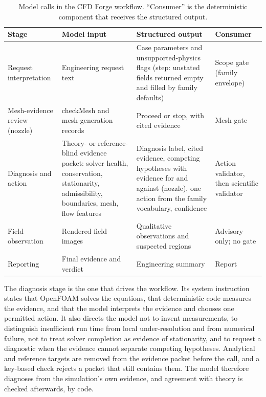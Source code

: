 \documentclass[11pt]{article}
\begin{document}
\begin{table}[!htbp]
\centering
\caption{Model calls in the CFD Forge workflow. ``Consumer'' is the
deterministic component that receives the structured output.}
\label{tab:llm_stages}
\footnotesize
\setlength{\tabcolsep}{3pt}
\begin{tabularx}{\linewidth}{@{}>{\raggedright\arraybackslash}p{2.3cm}
  >{\raggedright\arraybackslash}X >{\raggedright\arraybackslash}X
  >{\raggedright\arraybackslash}p{3.1cm}@{}}
\toprule
Stage & Model input & Structured output & Consumer \\
\midrule
Request interpretation & Engineering request text & Case parameters and unsupported-physics flags (step: unstated fields returned empty and filled by family defaults) & Scope gate (family envelope) \\
Mesh-evidence review (nozzle) & checkMesh and mesh-generation records & Proceed or stop, with cited evidence & Mesh gate \\
Diagnosis and action & Theory- or reference-blind evidence packet: solver health, conservation, stationarity, admissibility, boundaries, mesh, flow features & Diagnosis label, cited evidence, competing hypotheses with evidence for and against (nozzle), one action from the family vocabulary, confidence & Action validator, then scientific validator \\
Field observation & Rendered field images & Qualitative observations and suspected regions & Advisory only; no gate \\
Reporting & Final evidence and verdict & Engineering summary & Report \\
\bottomrule
\end{tabularx}
\end{table}

The diagnosis stage is the one that drives the workflow. Its system
instruction states that OpenFOAM solves the equations, that deterministic
code measures the evidence, and that the model interprets the evidence and
chooses one permitted action. It also directs the model not to invent
measurements, to distinguish insufficient run time from local
under-resolution and from numerical failure, not to treat solver completion
as evidence of stationarity, and to request a diagnostic when the evidence
cannot separate competing hypotheses. Analytical and reference targets are
removed from the evidence packet before the call, and a key-based check
rejects a packet that still contains them. The model therefore diagnoses from
the simulation's own evidence, and agreement with theory is checked
afterwards, by code.
\end{document}
